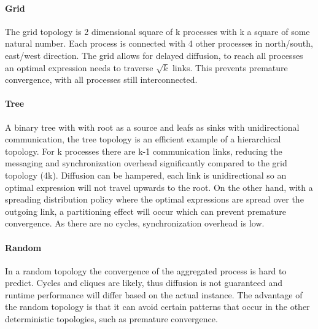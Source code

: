\paragraph{Grid}
The grid topology is 2 dimensional square of k processes with k a square of some natural number. Each process is connected with 4 other processes in north/south, east/west direction. The grid allows for delayed diffusion, to reach all processes an optimal expression needs to traverse $\sqrt{k}$ links. This prevents premature convergence, with all processes still interconnected.
\paragraph{Tree}
A binary tree with with root as a source and leafs as sinks with unidirectional communication, the tree topology is an efficient example of a hierarchical topology. For k processes there are k-1 communication links, reducing the messaging and synchronization overhead significantly compared to the grid topology (4k). Diffusion can be hampered, each link is unidirectional so an optimal expression will not travel upwards to the root. On the other hand, with a spreading distribution policy where the optimal expressions are spread over the outgoing link, a partitioning effect will occur which can prevent premature convergence. As there are no cycles, synchronization overhead is low.
\paragraph{Random}
In a random topology the convergence of the aggregated process is hard to predict. Cycles and cliques are likely, thus diffusion is not guaranteed and runtime performance will differ based on the actual instance. The advantage of the random topology is that it can avoid certain patterns that occur in the other deterministic topologies, such as premature convergence.